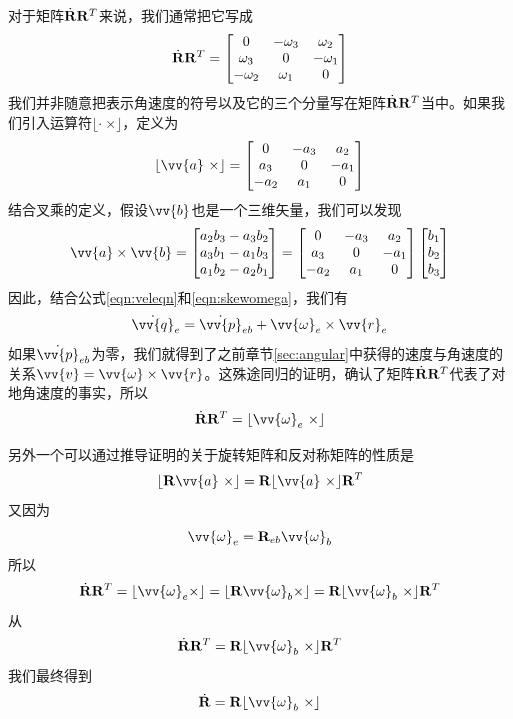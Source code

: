 \documentclass[11pt]{article}
\begin{document}
对于矩阵$\dot{{\bf R}}{\bf R}^T$来说，我们通常把它写成
\begin{equation}\label{eqn:skewomega}
\dot{{\bf R}}{\bf R}^T = \begin{bmatrix}
0 & -\omega_3 & \omega_2\\
\omega_3 & 0 & - \omega_1\\
-\omega_2 & \omega_1 & 0
\end{bmatrix}
\end{equation}
我们并非随意把表示角速度的符号以及它的三个分量写在矩阵$\dot{{\bf R}}{\bf R}^T$当中。如果我们引入运算符$\lfloor \cdot \ \times \rfloor$，定义为
$$
\lfloor \vv{a} \ \times \rfloor =  \begin{bmatrix}
0 & -a_3 & a_2\\
a_3 & 0 & - a_1\\
-a_2 & a_1 & 0
\end{bmatrix}
$$
结合叉乘的定义，假设$\vv{b}$也是一个三维矢量，我们可以发现
$$
\vv{a} \times \vv{b} = 
\begin{bmatrix}
a_2b_3-a_3b_2\\
a_3b_1-a_1b_3\\
a_1b_2-a_2b_1
\end{bmatrix} =
\begin{bmatrix}
0 & -a_3 & a_2\\
a_3 & 0 & - a_1\\
-a_2 & a_1 & 0
\end{bmatrix}
\begin{bmatrix}
b_1\\
b_2\\
b_3
\end{bmatrix}
$$
因此，结合公式\ref{eqn:veleqn}和\ref{eqn:skewomega}，我们有
$$
\dot{\vv{q}}_{e}  = \dot{ \vv{p}}_{eb} + \vv{\omega}_e \times \vv{r}_e
$$
如果$\dot{ \vv{p}}_{eb}$为零，我们就得到了之前章节\ref{sec:angular}中获得的速度与角速度的关系$\vv{v} = \vv{\omega} \times \vv{r}$。这殊途同归的证明，确认了矩阵$\dot{{\bf R}}{\bf R}^T$代表了对地角速度的事实，所以
$$
\dot{{\bf R}}{\bf R}^T = \lfloor \vv{\omega}_e\  \times \rfloor
$$

另外一个可以通过推导证明的关于旋转矩阵和反对称矩阵的性质是
$$
\lfloor {\bf R}\vv{a} \ \times \rfloor = {\bf R} \lfloor \vv{a} \ \times \rfloor {\bf R}^T
$$
又因为
$$
\vv{\omega}_e = {\bf R}_{eb}\vv{\omega}_b
$$
所以
$$
\dot{{\bf R}}{\bf R}^T = 
\lfloor \vv{\omega}_e \times \rfloor = 
\lfloor {\bf R}\vv{\omega}_b \times \rfloor = 
{\bf R} \lfloor \vv{\omega}_b \ \times \rfloor {\bf R}^T
$$
从
$$
\dot{{\bf R}}{\bf R}^T  =
{\bf R} \lfloor \vv{\omega}_b \ \times \rfloor {\bf R}^T
$$
我们最终得到
$$
\dot{{\bf R}} = {\bf R}\lfloor \vv{\omega}_b \ \times \rfloor
$$
\end{document}
